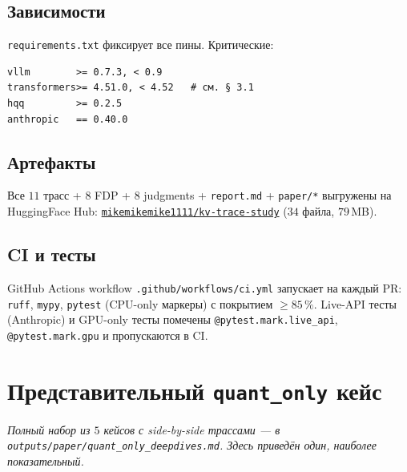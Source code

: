 \documentclass[11pt, a4paper]{article}
\newcommand{\code}[1]{\texttt{#1}}
\begin{document}
\subsection{Зависимости}

\code{requirements.txt} фиксирует все пины. Критические:
\begin{lstlisting}
vllm        >= 0.7.3, < 0.9
transformers>= 4.51.0, < 4.52   # см. § 3.1
hqq         >= 0.2.5
anthropic   == 0.40.0
\end{lstlisting}

\subsection{Артефакты}

Все $11$ трасс + $8$ FDP + $8$ judgments + \code{report.md} + \code{paper/*}
выгружены на HuggingFace Hub:
\href{https://huggingface.co/datasets/mikemikemike1111/kv-trace-study}
{\code{mikemikemike1111/kv-trace-study}} ($34$ файла, $79\,$MB).

\subsection{CI и тесты}

GitHub Actions workflow \code{.github/workflows/ci.yml} запускает на
каждый PR: \code{ruff}, \code{mypy}, \code{pytest} (CPU-only маркеры) с
покрытием $\geq 85\,\%$. Live-API тесты (Anthropic) и GPU-only тесты
помечены \code{@pytest.mark.live\_api}, \code{@pytest.mark.gpu} и
пропускаются в CI.

\appendix
\section{Представительный \code{quant\_only} кейс}
\label{app:case1}

\textit{Полный набор из $5$ кейсов с side-by-side трассами —
в \code{outputs/paper/quant\_only\_deepdives.md}. Здесь приведён один,
наиболее показательный.}
\end{document}
